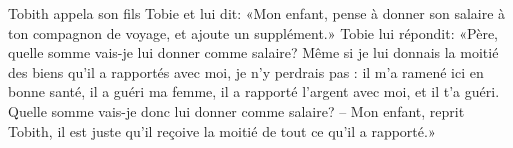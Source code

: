 Tobith appela son fils Tobie et lui dit:
	«Mon enfant, pense à donner son salaire à ton compagnon de voyage,
	et ajoute un supplément.»
Tobie lui répondit:
	«Père, quelle somme vais-je lui donner comme salaire?
	Même si je lui donnais la moitié des biens qu’il a rapportés avec moi,
	je n’y perdrais pas :
	il m’a ramené ici en bonne santé, il a guéri ma femme,
	il a rapporté l’argent avec moi, et il t’a guéri.
Quelle somme vais-je donc lui donner comme salaire?
– Mon enfant, reprit Tobith,
	il est juste qu’il reçoive la moitié de tout ce qu’il a rapporté.»
